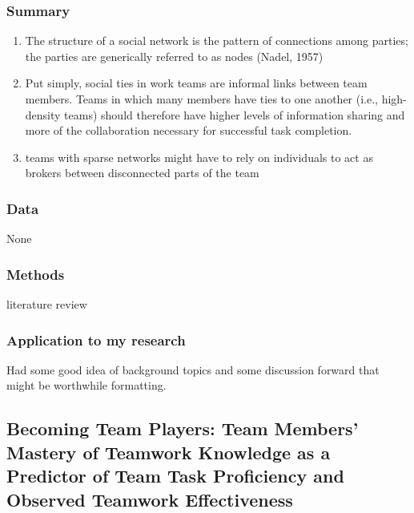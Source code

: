 \documentclass[12pt]{article}
\begin{document}
\subsubsection*{Summary}
\begin{enumerate}
    \item The structure of a social network is the pattern of connections among parties; the parties are generically referred to as nodes (Nadel, 1957)
    \item Put simply, social ties in work teams are informal links between team members. Teams in which many members have ties to one another (i.e., high- density teams) should therefore have higher levels of information sharing and more of the collaboration necessary for successful task completion.
    \item teams with sparse networks might have to rely on individuals to act as brokers between disconnected parts of the team
\end{enumerate}

\subsubsection*{Data}

None

\subsubsection*{Methods}

literature review

\subsubsection*{Application to my research}

Had some good idea of background topics and some discussion forward that might be worthwhile formatting.


\subsection*{Becoming Team Players: Team Members’ Mastery of Teamwork Knowledge as a Predictor of Team Task Proficiency and Observed Teamwork Effectiveness\cite{becoming_team_player}}
\end{document}
